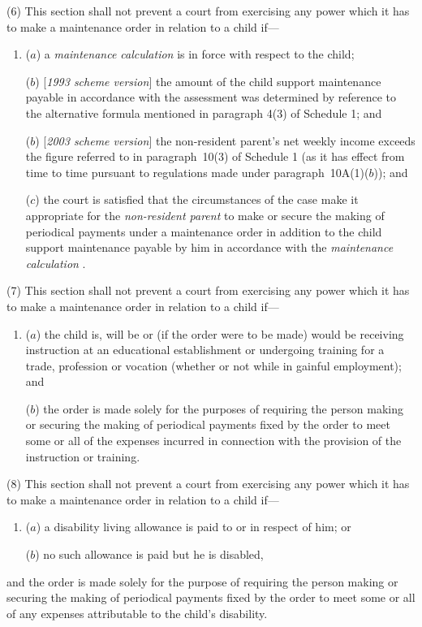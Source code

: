 \documentclass[12pt,a4paper]{article}
\begin{document}
(6) This section shall not prevent a court from exercising any power which it has to make a maintenance order in relation to a child if—
\begin{enumerate}\item[]
($a$) a 
\emph{maintenance calculation}  %
is in force with respect to the child;

($b$) [\emph{1993 scheme version}] the amount of the child support maintenance payable in accordance with the assessment was determined by reference to the alternative formula mentioned in paragraph 4(3)  of Schedule 1; and

($b$) [\emph{2003 scheme version}] the non-resident parent’s net weekly income exceeds the figure referred to in paragraph~10(3)  of Schedule 1 (as it has effect from time to time pursuant to regulations made under paragraph~10A(1)($b$)); and

($c$) the court is satisfied that the circumstances of the case make it appropriate for the 
\emph{non-resident parent}  %
to make or secure the making of periodical payments under a maintenance order in addition to the child support maintenance payable by him in accordance with the 
\emph{maintenance calculation}%
.
\end{enumerate}

(7) This section shall not prevent a court from exercising any power which it has to make a maintenance order in relation to a child if—
\begin{enumerate}\item[]
($a$) the child is, will be or (if the order were to be made) would be receiving instruction at an educational establishment or undergoing training for a trade, profession or vocation (whether or not while in gainful employment); and

($b$) the order is made solely for the purposes of requiring the person making or securing the making of periodical payments fixed by the order to meet some or all of the expenses incurred in connection with the provision of the instruction or training.
\end{enumerate}

(8) This section shall not prevent a court from exercising any power which it has to make a maintenance order in relation to a child if—
\begin{enumerate}\item[]
($a$) a disability living allowance is paid to or in respect of him; or

($b$) no such allowance is paid but he is disabled,
\end{enumerate}
and the order is made solely for the purpose of requiring the person making or securing the making of periodical payments fixed by the order to meet some or all of any expenses attributable to the child’s disability.
\end{document}
